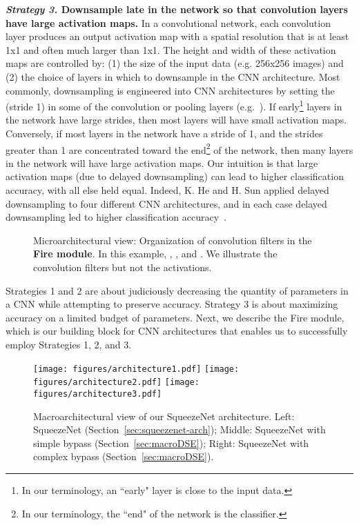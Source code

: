 \documentclass{article} \usepackage{iclr2017_conference,times}
\renewcommand{\cite}{\citep}
\begin{document}
\noindent
{\bf {\em Strategy 3.} Downsample late in the network so that convolution layers have large activation maps.}
In a convolutional network, each convolution layer produces an output activation map with a spatial resolution that is at least 1x1 and often much larger than 1x1. 
The height and width of these activation maps are controlled by: (1) the size of the input data (e.g. 256x256 images) and (2) the choice of layers in which to downsample in the CNN architecture.
Most commonly, downsampling is engineered into CNN architectures by setting the (stride  1) in some of the convolution or pooling layers (e.g.~\cite{googlenet,VGG-19,alexnet}).
If early\footnote{In our terminology, an ``early" layer is close to the input data.} layers in the network have large strides, then most layers will have small activation maps.
Conversely, if most layers in the network have a stride of 1, and the strides greater than 1 are concentrated toward the end\footnote{In our terminology, the ``end" of the network is the classifier.} of the network, then many layers in the network will have large activation maps.
Our intuition is that large activation maps (due to delayed downsampling) can lead to higher classification accuracy, with all else held equal.
Indeed, K. He and H. Sun applied delayed downsampling to four different CNN architectures, and in each case delayed downsampling led to higher classification accuracy~\cite{ConstrainedTimeCost}. 

\begin{figure}[!t]
	\centering
	\caption[Microarchitectural view of the Fire module]{Microarchitectural view: Organization of convolution filters in the {\bf Fire module}. In this example, , , and . We illustrate the convolution filters but not the activations.}
	\label{fig:fire-module}
\end{figure}

Strategies 1 and 2 are about judiciously decreasing the quantity of parameters in a CNN while attempting to preserve accuracy.
Strategy 3 is about maximizing accuracy on a limited budget of parameters.
Next, we describe the Fire module, which is our building block for CNN architectures that enables us to successfully employ Strategies 1, 2, and 3.

\begin{figure*}[!t]
	\centering
	\texttt{[image: figures/architecture1.pdf]}
	\hspace{1em}
	\texttt{[image: figures/architecture2.pdf]}
	\hspace{5em}
	\texttt{[image: figures/architecture3.pdf]}
	\caption[Macroarchitectural view of the SqueezeNet architecture]{Macroarchitectural view of our SqueezeNet architecture. Left: SqueezeNet (Section~\ref{sec:squeezenet-arch}); Middle: SqueezeNet with simple bypass (Section~\ref{sec:macroDSE}); Right: SqueezeNet with complex bypass (Section~\ref{sec:macroDSE}).}
	\label{fig:SqueezeNet-architecture}
\end{figure*}
\end{document}
